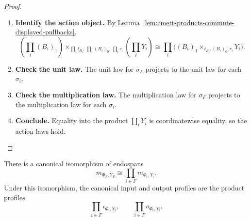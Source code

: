 \begin{proof}
    \leavevmode
    \begin{enumerate}
        \item \textbf{Identify the action object.}
        By Lemma~\ref{lem:cmett-products-commute-displayed-pullbacks},
        \[
            \left(\prod_i(B_i)_1\right)
            \times_{\prod_i t_{B_i},\,\prod_i(B_i)_0,\,\prod_i r_i}
            \left(\prod_iY_i\right)
            \cong
            \prod_i\bigl((B_i)_1\times_{t_{B_i},(B_i)_0,r_i}Y_i\bigr).
        \]

        \item \textbf{Check the unit law.}
        The unit law for \(\sigma_F\) projects to the unit law for each
        \(\sigma_i\).

        \item \textbf{Check the multiplication law.}
        The multiplication law for \(\sigma_F\) projects to the multiplication
        law for each \(\sigma_i\).

        \item \textbf{Conclude.}
        Equality into the product \(\prod_iY_i\) is coordinatewise equality,
        so the action laws hold.
    \end{enumerate}
\end{proof}

\begin{theorem}
\label{thm:cmett-execution-preserves-finite-tensors}
    There is a canonical isomorphism of endospans
    \[
        m_{\Phi_F,Y_F}
        \cong
        \prod_{i\in F}m_{\Phi_i,Y_i}.
    \]
    Under this isomorphism, the canonical input and output profiles are the
    product profiles
    \[
        \prod_{i\in F}\iota_{\Phi_i,Y_i},
        \qquad
        \prod_{i\in F}o_{\Phi_i,Y_i}.
    \]
\end{theorem}

